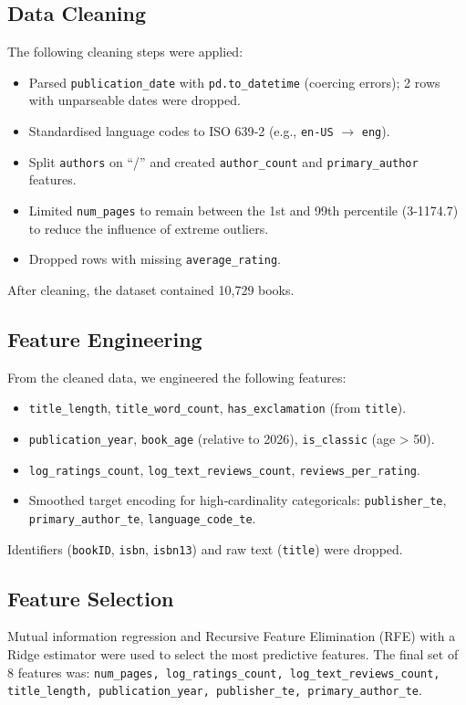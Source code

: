 \documentclass[11pt,a4paper]{article}
\begin{document}
\subsection{Data Cleaning}
The following cleaning steps were applied:
\begin{itemize}
    \item Parsed \texttt{publication\_date} with \texttt{pd.to\_datetime} (coercing errors); 2 rows with unparseable dates were dropped.
    \item Standardised language codes to ISO 639‑2 (e.g., \texttt{en-US} $\rightarrow$ \texttt{eng}).
    \item Split \texttt{authors} on “/” and created \texttt{author\_count} and \texttt{primary\_author} features.
    \item Limited \texttt{num\_pages} to remain between the 1st and 99th percentile (3-1174.7) to reduce the influence of extreme outliers.
    \item Dropped rows with missing \texttt{average\_rating}.
\end{itemize}
After cleaning, the dataset contained 10,729 books.

\subsection{Feature Engineering}
From the cleaned data, we engineered the following features:
\begin{itemize}
    \item \texttt{title\_length}, \texttt{title\_word\_count}, \texttt{has\_exclamation} (from \texttt{title}).
    \item \texttt{publication\_year}, \texttt{book\_age} (relative to 2026), \texttt{is\_classic} (age > 50).
    \item \texttt{log\_ratings\_count}, \texttt{log\_text\_reviews\_count}, \texttt{reviews\_per\_rating}.
    \item Smoothed target encoding for high‑cardinality categoricals: \texttt{publisher\_te}, \\ \texttt{primary\_author\_te}, \texttt{language\_code\_te}.
\end{itemize}
Identifiers (\texttt{bookID}, \texttt{isbn}, \texttt{isbn13}) and raw text (\texttt{title}) were dropped.

\subsection{Feature Selection}
Mutual information regression and Recursive Feature Elimination (RFE) with a Ridge estimator were used to select the most predictive features. The final set of 8 features was:
\texttt{num\_pages, log\_ratings\_count, log\_text\_reviews\_count, \\ title\_length, publication\_year, publisher\_te, primary\_author\_te}.
\end{document}
